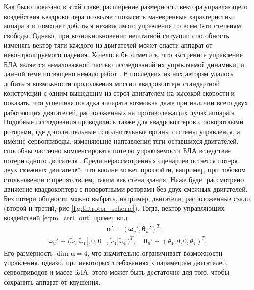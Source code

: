 Как было показано в этой главе, расширение размерности вектора управляющего воздействия квадрокоптера позволяет повысить маневренные характеристики аппарата и помогает добиться независимого управления по всем 6-ти степеням свободы.
Однако, при возникникновении нештатной ситуации способность изменять вектор тяги каждого из двигателей может спасти аппарат от неконтролируемого падения.
Хотелось бы отметить, что экстренное управление БЛА является немаловажной частью исследований их управляемой динамики, и данной теме посвящено немало работ \cite{Morozov01, Lippiello01, Mueller01}. В последних из них авторам удалось добиться возможности продолжения миссии квадрокоптера стандартной конструкции с одним вышедшим из строя двигателем на высокой скорости \cite{Sun01} и показать, что успешная посадка аппарата возможна даже при наличии всего двух работающих двигателей, расположенных на противолежащих лучах аппарата \cite{Sun01}. Подобные исследования проводились также для квадрокоптеров с поворотными роторами, где дополнительные исполнительные органы системы управления, а именно сервоприводы, изменяющие направления тяги оставшихся двигателей, способны частично компенсировать потерю управляемости БЛА вследствие потери одного двигателя \cite{Nemati02}.
Среди нерассмотренных сценариев остается потеря двух смежных двигателей, что вполне может произойти, например, при лобовом столкновении с препятствием, таким как стена здания. Ниже будет рассмотрено движение квадрокоптера с поворотными роторами без двух смежных двигателей.
Без потери общности можно выбрать, например, двигатели, расположенные сзади (второй и третий, рис \ref{fig:tiltrotor_scheme}). Тогда, вектор управляющих воздействий \eqref{eq:m_ctrl_out} примет вид
\begin{equation} \label{eq:em_ctrl_out}
\begin{aligned}
&\bm{u'} = (\bm \omega_u', \bm \theta_u')^T,
\\
\bm \omega_u' =
(\tilde\omega_1 |\tilde\omega_1|,
0,
0&,
\tilde\omega_4 |\tilde\omega_4|)^T,
\quad
\bm \theta_u' = (\theta_1, 0, 0, \theta_4 )^T.
\end{aligned}
\end{equation}
Его размерность $\dim \bm{u}=4$, что значительно ограничивает возможности управления, однако, при некоторых требованиях к параметрам двигателей, сервоприводов и массе БЛА, этого может быть достаточно для того, чтобы сохранить аппарат от крушения. 

